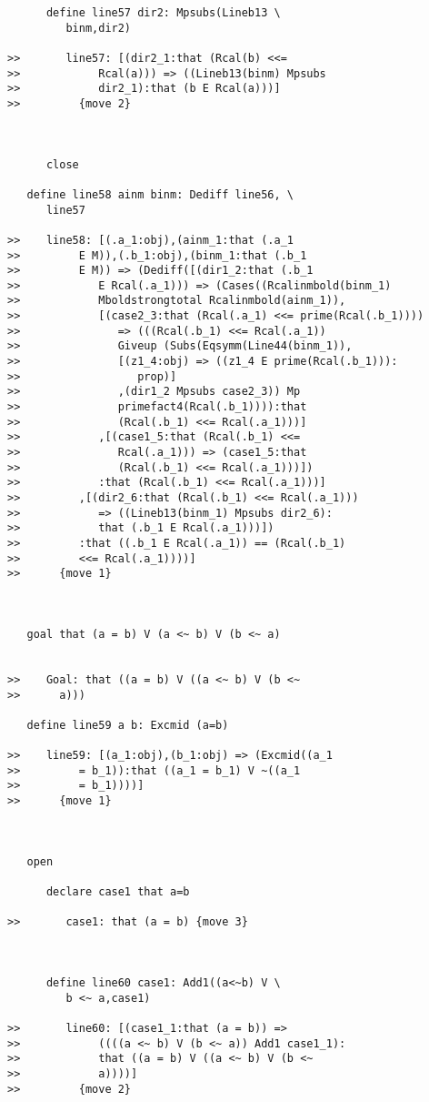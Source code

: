 \documentclass[12pt]{article}
\begin{document}
\begin{verbatim}
      define line57 dir2: Mpsubs(Lineb13 \
         binm,dir2)

>>       line57: [(dir2_1:that (Rcal(b) <<=
>>            Rcal(a))) => ((Lineb13(binm) Mpsubs
>>            dir2_1):that (b E Rcal(a)))]
>>         {move 2}



      close

   define line58 ainm binm: Dediff line56, \
      line57

>>    line58: [(.a_1:obj),(ainm_1:that (.a_1
>>         E M)),(.b_1:obj),(binm_1:that (.b_1
>>         E M)) => (Dediff([(dir1_2:that (.b_1
>>            E Rcal(.a_1))) => (Cases((Rcalinmbold(binm_1)
>>            Mboldstrongtotal Rcalinmbold(ainm_1)),
>>            [(case2_3:that (Rcal(.a_1) <<= prime(Rcal(.b_1))))
>>               => (((Rcal(.b_1) <<= Rcal(.a_1))
>>               Giveup (Subs(Eqsymm(Line44(binm_1)),
>>               [(z1_4:obj) => ((z1_4 E prime(Rcal(.b_1))):
>>                  prop)]
>>               ,(dir1_2 Mpsubs case2_3)) Mp
>>               primefact4(Rcal(.b_1)))):that
>>               (Rcal(.b_1) <<= Rcal(.a_1)))]
>>            ,[(case1_5:that (Rcal(.b_1) <<=
>>               Rcal(.a_1))) => (case1_5:that
>>               (Rcal(.b_1) <<= Rcal(.a_1)))])
>>            :that (Rcal(.b_1) <<= Rcal(.a_1)))]
>>         ,[(dir2_6:that (Rcal(.b_1) <<= Rcal(.a_1)))
>>            => ((Lineb13(binm_1) Mpsubs dir2_6):
>>            that (.b_1 E Rcal(.a_1)))])
>>         :that ((.b_1 E Rcal(.a_1)) == (Rcal(.b_1)
>>         <<= Rcal(.a_1))))]
>>      {move 1}



   goal that (a = b) V (a <~ b) V (b <~ a)


>>    Goal: that ((a = b) V ((a <~ b) V (b <~
>>      a)))

   define line59 a b: Excmid (a=b)

>>    line59: [(a_1:obj),(b_1:obj) => (Excmid((a_1
>>         = b_1)):that ((a_1 = b_1) V ~((a_1
>>         = b_1))))]
>>      {move 1}



   open

      declare case1 that a=b

>>       case1: that (a = b) {move 3}



      define line60 case1: Add1((a<~b) V \
         b <~ a,case1)

>>       line60: [(case1_1:that (a = b)) =>
>>            ((((a <~ b) V (b <~ a)) Add1 case1_1):
>>            that ((a = b) V ((a <~ b) V (b <~
>>            a))))]
>>         {move 2}




\end{verbatim}
\end{document}
